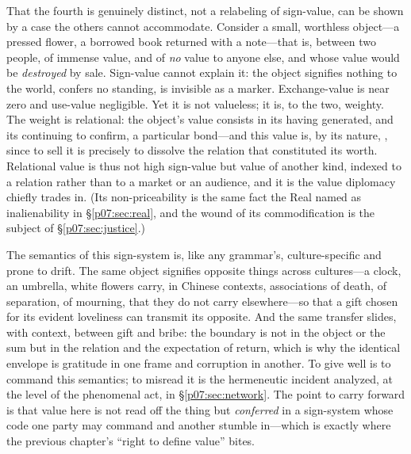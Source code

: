 \documentclass[11pt,a4paper]{article}
\newcommand{\emb}[1]{\textcolor{rose}{\oldtextbf{#1}}}
\newcommand{\xref}[1]{\textcolor{rose}{\S\ref{#1}}}
\begin{document}
That the fourth is genuinely distinct, not a relabeling of sign-value, can be shown by a case the others cannot accommodate. Consider a small, worthless object---a pressed flower, a borrowed book returned with a note---that is, between two people, of immense value, and of \emph{no} value to anyone else, and whose value would be \emph{destroyed} by sale. Sign-value cannot explain it: the object signifies nothing to the world, confers no standing, is invisible as a marker. Exchange-value is near zero and use-value negligible. Yet it is not valueless; it is, to the two, weighty. The weight is relational: the object's value consists in its having generated, and its continuing to confirm, a particular bond---and this value is, by its nature, \emb{non-transferable and non-priceable}, since to sell it is precisely to dissolve the relation that constituted its worth. Relational value is thus not high sign-value but value of another kind, indexed to a relation rather than to a market or an audience, and it is the value diplomacy chiefly trades in. (Its non-priceability is the same fact the Real named as inalienability in \xref{p07:sec:real}, and the wound of its commodification is the subject of \xref{p07:sec:justice}.)

The semantics of this sign-system is, like any grammar's, culture-specific and prone to drift. The same object signifies opposite things across cultures---a clock, an umbrella, white flowers carry, in Chinese contexts, associations of death, of separation, of mourning, that they do not carry elsewhere---so that a gift chosen for its evident loveliness can transmit its opposite. And the same transfer slides, with context, between gift and bribe: the boundary is not in the object or the sum but in the relation and the expectation of return, which is why the identical envelope is gratitude in one frame and corruption in another. To give well is to command this semantics; to misread it is the hermeneutic incident analyzed, at the level of the phenomenal act, in \xref{p07:sec:network}. The point to carry forward is that value here is not read off the thing but \emph{conferred} in a sign-system whose code one party may command and another stumble in---which is exactly where the previous chapter's ``right to define value'' bites.
\end{document}
